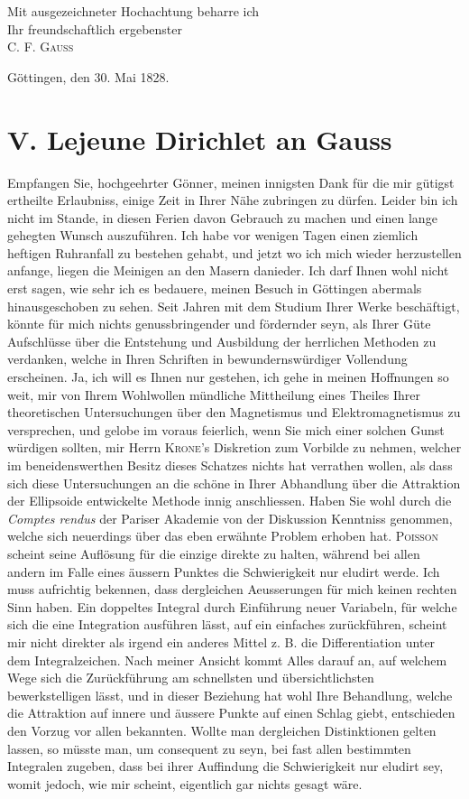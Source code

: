 \documentclass[11pt]{article}
\newcommand{\scn}[1]{\textsc{#1}}
\begin{document}
\begin{flushright}
Mit ausgezeichneter Hochachtung beharre ich\\
Ihr freundschaftlich ergebenster\\
\scn{C. F. Gauss}
\end{flushright}
Göttingen, den 30. Mai 1828.

\section*{V. Lejeune Dirichlet an Gauss}

Empfangen Sie, hochgeehrter Gönner, meinen innigsten Dank für die mir gütigst ertheilte Erlaubniss, einige Zeit in Ihrer Nähe zubringen zu dürfen. Leider bin ich nicht im Stande, in diesen Ferien davon Gebrauch zu machen und einen lange gehegten Wunsch auszuführen. Ich habe vor wenigen Tagen einen ziemlich heftigen Ruhranfall zu bestehen gehabt, und jetzt wo ich mich wieder herzustellen anfange, liegen die Meinigen an den Masern danieder. Ich darf Ihnen wohl nicht erst sagen, wie sehr ich es bedauere, meinen Besuch in Göttingen abermals hinausgeschoben zu sehen. Seit Jahren mit dem Studium Ihrer Werke beschäftigt, könnte für mich nichts genussbringender und fördernder seyn, als Ihrer Güte Aufschlüsse über die Entstehung und Ausbildung der herrlichen Methoden zu verdanken, welche in Ihren Schriften in bewundernswürdiger Vollendung erscheinen. Ja, ich will es Ihnen nur gestehen, ich gehe in meinen Hoffnungen so weit, mir von Ihrem Wohlwollen mündliche Mittheilung eines Theiles Ihrer theoretischen Untersuchungen über den Magnetismus und Elektromagnetismus zu versprechen, und gelobe im voraus feierlich, wenn Sie mich einer solchen Gunst würdigen sollten, mir Herrn \scn{Krone}'s Diskretion zum Vorbilde zu nehmen, welcher im beneidenswerthen Besitz dieses Schatzes nichts hat verrathen wollen, als dass sich diese Untersuchungen an die schöne in Ihrer Abhandlung über die Attraktion der Ellipsoide entwickelte Methode innig anschliessen. Haben Sie wohl durch die \emph{Comptes rendus} der Pariser Akademie von der Diskussion Kenntniss genommen, welche sich neuerdings über das eben erwähnte Problem erhoben hat. \scn{Poisson} scheint seine Auflösung für die einzige direkte zu halten, während bei allen andern im Falle eines äussern Punktes die Schwierigkeit nur eludirt werde. Ich muss aufrichtig bekennen, dass dergleichen Aeusserungen für mich keinen rechten Sinn haben. Ein doppeltes Integral durch Einführung neuer Variabeln, für welche sich die eine Integration ausführen lässt, auf ein einfaches zurückführen, scheint mir nicht direkter als irgend ein anderes Mittel z. B. die Differentiation unter dem Integralzeichen. Nach meiner Ansicht kommt Alles darauf an, auf welchem Wege sich die Zurückführung am schnellsten und übersichtlichsten bewerkstelligen lässt, und in dieser Beziehung hat wohl Ihre Behandlung, welche die Attraktion auf innere und äussere Punkte auf einen Schlag giebt, entschieden den Vorzug vor allen bekannten. Wollte man dergleichen Distinktionen gelten lassen, so müsste man, um consequent zu seyn, bei fast allen bestimmten Integralen zugeben, dass bei ihrer Auffindung die Schwierigkeit nur eludirt sey, womit jedoch, wie mir scheint, eigentlich gar nichts gesagt wäre.
\end{document}
